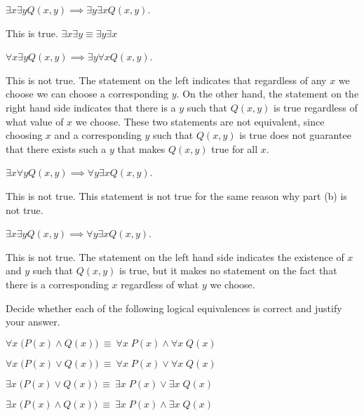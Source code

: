 \documentclass[11pt]{article}
\begin{document}
\begin{Parts}

\item
$\exists x \exists y Q(x,y) \implies \exists y \exists x Q(x,y)$.

\begin{solution}
    This is true. $\exists x \exists y \equiv \exists y \exists x$
\end{solution}
    

\item
$\forall x \exists y Q(x,y) \implies \exists y\forall x Q(x,y)$.
    
\begin{solution}
    This is not true. The statement on the left indicates that regardless of any $x$ we choose we can choose a corresponding $y$. On the other hand, the statement on the right hand side indicates that there is a $y$ such that $Q(x, y)$ is true regardless of what value of $x$ we choose. These two statements are not equivalent, since choosing $x$ and a corresponding $y$ such that $Q(x, y)$ is true does not guarantee that there exists such a $y$ that makes $Q(x, y)$ true for all $x$.
\end{solution}

\item
$\exists x \forall y Q(x,y) \implies \forall y \exists x Q(x,y)$.

\begin{solution}
    This is not true. This statement is not true for the same reason why part (b) is not true. 
\end{solution}
    

\item
$\exists x \exists y Q(x,y) \implies \forall y \exists x Q(x,y)$.

\begin{solution}
    This is not true. The statement on the left hand side indicates the existence of $x$ and $y$ such that $Q(x, y)$ is true, but it makes no statement on the fact that there is a corresponding $x$ regardless of what $y$ we choose. 
\end{solution}
    

\end{Parts}


Decide whether each of the following logical equivalences is correct and justify your answer. 

\begin{Parts}
    \Part $\forall x \; \bigl( P(x) \wedge Q(x) \bigr)~\equiv~\forall x \; P(x) \wedge \forall x \; Q(x)$
    
    \Part $\forall x \; \bigl( P(x) \vee Q(x) \bigr)~\equiv~\forall x \; P(x) \vee \forall x \; Q(x)$
    
    \Part $\exists x \; \bigl( P(x) \vee Q(x) \bigr)~\equiv~\exists x \; P(x) \vee \exists x \; Q(x)$
    
    \Part $\exists x \; \bigl( P(x) \wedge Q(x) \bigr)~\equiv~\exists x \; P(x) \wedge \exists x \; Q(x)$
    
\end{Parts}
\end{document}
